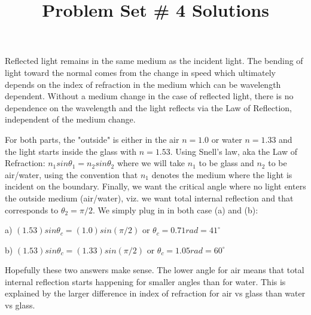 \documentclass[10pt]{article}
\newenvironment{problem}[2][Problem]{\begin{trivlist}
\item[\hskip \labelsep {\bfseries #1}\hskip \labelsep {\bfseries #2.}]}{\end{trivlist}}
\begin{document}
 \title{Problem Set \# 4 Solutions}
\date{}
\maketitle

\begin{problem}{1}
Reflected light remains in the same medium as the incident light. The bending of light toward the normal comes from the change in speed which ultimately depends on the index of refraction in the medium which can be wavelength dependent. Without a medium change in the case of reflected light, there is no dependence on the wavelength and the light reflects via the Law of Reflection, independent of the medium change.

\end{problem}


 \begin{problem}{2}
\item For both parts, the "outside" is either in the air $n=1.0$ or water $n=1.33$ and the light starts inside the glass with $n=1.53$. Using Snell's law, aka the Law of Refraction: $n_1 sin\theta_1 = n_2 sin\theta_2$ where we will take $n_1$ to be glass and $n_2$ to be air/water, using the convention that $n_1$ denotes the medium where the light is incident on the boundary. Finally, we want the critical angle where no light enters the outside medium (air/water), viz. we want total internal reflection and that corresponds to $\theta_2=\pi/2$. We simply plug in in both case (a) and (b):

\item a) $(1.53) sin\theta_c= (1.0) sin(\pi/2)$ or $\theta_c=0.71rad=41^\circ$

\item b) $(1.53) sin\theta_c= (1.33) sin(\pi/2)$ or $\theta_c=1.05rad=60^\circ$

\item
Hopefully these two answers make sense. The lower angle for air means that total internal reflection starts happening for smaller angles than for water. This is explained by the larger difference in index of refraction for air vs glass than water vs glass.
\end{problem}
\end{document}
